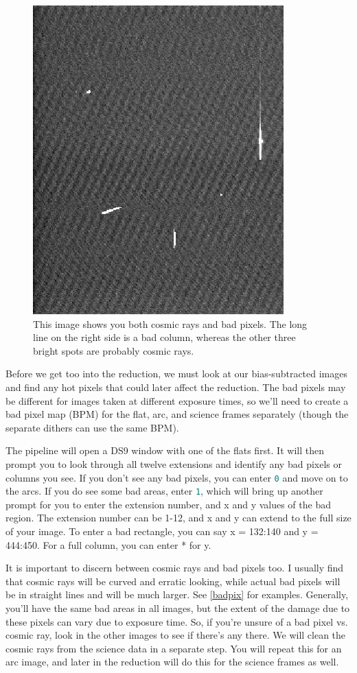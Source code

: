 \documentclass[12pt]{report}
\newcommand{\ty}[1]{\textcolor{teal}{\texttt{#1}}}
\begin{document}
\begin{figure}[h]
\centering
\includegraphics[scale=0.8]{CRvsBP.jpeg}
\caption[Cosmic Rays vs. Bad Pixels]{This image shows you both cosmic rays and bad pixels. The long line on the right side is a bad column, whereas the other three bright spots are probably cosmic rays.}
\label{fig:badpix}
\end{figure}

Before we get too into the reduction, we must look at our bias-subtracted images and find any hot pixels that could later affect the reduction. The bad pixels may be different for images taken at different exposure times, so we'll need to create a bad pixel map (BPM) for the flat, arc, and science frames separately (though the separate dithers can use the same BPM).

The pipeline will open a DS9 window with one of the flats first. It will then prompt you to look through all twelve extensions and identify any bad pixels or columns you see. If you don't see any bad pixels, you can enter \ty{0} and move on to the arcs. If you do see some bad areas, enter \ty{1}, which will bring up another prompt for you to enter the extension number, and x and y values of the bad region. The extension number can be 1-12, and x and y can extend to the full size of your image. To enter a bad rectangle, you can say x = 132:140 and y = 444:450. For a full column, you can enter * for y.

It is important to discern between cosmic rays and bad pixels too. I usually find that cosmic rays will be curved and erratic looking, while actual bad pixels will be in straight lines and will be much larger. See \autoref{badpix} for examples. Generally, you'll have the same bad areas in all images, but the extent of the damage due to these pixels can vary due to exposure time. So, if you're unsure of a bad pixel vs. cosmic ray, look in the other images to see if there's any there. We will clean the cosmic rays from the science data in a separate step. You will repeat this for an arc image, and later in the reduction will do this for the science frames as well.
\end{document}
